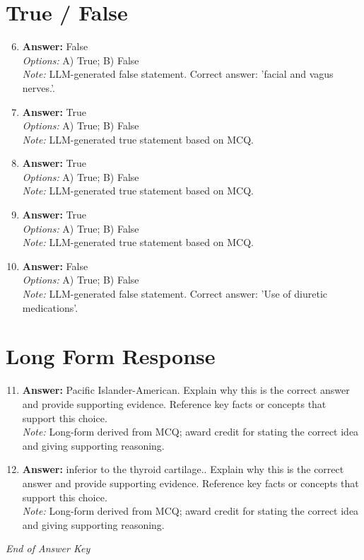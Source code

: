 \documentclass[12pt]{article}
\begin{document}
\section*{True / False}
\begin{enumerate}[label=\arabic*.]
\setcounter{enumi}{5}
\item \textbf{Answer:} False
\\ \textit{Options:} A) True; B) False
\\ \textit{Note:} LLM-generated false statement. Correct answer: 'facial and vagus nerves.'.
\item \textbf{Answer:} True
\\ \textit{Options:} A) True; B) False
\\ \textit{Note:} LLM-generated true statement based on MCQ.
\item \textbf{Answer:} True
\\ \textit{Options:} A) True; B) False
\\ \textit{Note:} LLM-generated true statement based on MCQ.
\item \textbf{Answer:} True
\\ \textit{Options:} A) True; B) False
\\ \textit{Note:} LLM-generated true statement based on MCQ.
\item \textbf{Answer:} False
\\ \textit{Options:} A) True; B) False
\\ \textit{Note:} LLM-generated false statement. Correct answer: 'Use of diuretic medications'.
\end{enumerate}

\section*{Long Form Response}
\begin{enumerate}[label=\arabic*.]
\setcounter{enumi}{10}
\item \textbf{Answer:} Pacific Islander-American. Explain why this is the correct answer and provide supporting evidence. Reference key facts or concepts that support this choice.
\\ \textit{Note:} Long-form derived from MCQ; award credit for stating the correct idea and giving supporting reasoning.
\item \textbf{Answer:} inferior to the thyroid cartilage.. Explain why this is the correct answer and provide supporting evidence. Reference key facts or concepts that support this choice.
\\ \textit{Note:} Long-form derived from MCQ; award credit for stating the correct idea and giving supporting reasoning.
\end{enumerate}

\vfill
\noindent\textit{End of Answer Key}
\end{document}
